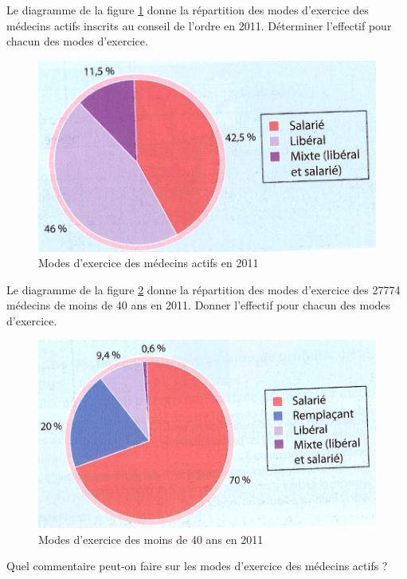 \begin{questions}
	
	\question[1] Le diagramme de la figure \ref{fig:mode_exercice1} donne la répartition des modes d'exercice des médecins actifs inscrits au conseil de l'ordre en 2011. Déterminer l'effectif pour chacun des modes d'exercice.
	
	\begin{figure}[h]
		\begin{center}
			\includegraphics[scale=0.35]{mode_exercice1}
			\caption{Modes d'exercice des médecins actifs en 2011}
			\label{fig:mode_exercice1}
		\end{center}
	\end{figure}
	
	\question[1] Le diagramme de la figure \ref{fig:mode_exercice2} donne la répartition des modes d'exercice des \num{27774} médecins de moins de 40 ans en 2011. Donner l'effectif pour chacun des modes d'exercice.
	
	\begin{figure}[h]
		\begin{center}
			\includegraphics[scale=0.35]{mode_exercice2}
			\caption{Modes d'exercice des moins de 40 ans en 2011}
			\label{fig:mode_exercice2}
		\end{center}
	\end{figure}
	
	
	\question[1\half] Quel commentaire peut-on faire sur les modes d'exercice des médecins actifs ?
\end{questions}